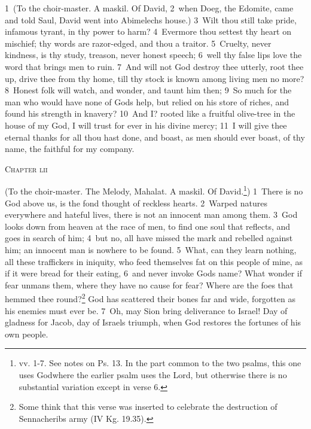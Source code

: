 \documentclass[10pt]{book} %
\begin{document}
\textcolor{benred8}{1}~(To the choir-master. A maskil. Of David, \textcolor{benred8}{2}~when Doeg, the Edomite, came and told Saul, David went into Abimelech\textquotesingle s house.)
\textcolor{benred8}{3}~Wilt thou still take pride, infamous tyrant, in thy power to harm? \textcolor{benred8}{4}~Evermore thou settest thy heart on mischief; thy words are razor-edged, and thou a traitor. \textcolor{benred8}{5}~Cruelty, never kindness, is thy study, treason, never honest speech; \textcolor{benred8}{6}~well thy false lips love the word that brings men to ruin. \textcolor{benred8}{7}~And will not God destroy thee utterly, root thee up, drive thee from thy home, till thy stock is known among living men no more? \textcolor{benred8}{8}~Honest folk will watch, and wonder, and taunt him then; \textcolor{benred8}{9}~So much for the man who would have none of God\textquotesingle s help, but relied on his store of riches, and found his strength in knavery? \textcolor{benred8}{10}~And I? rooted like a fruitful olive-tree in the house of my God, I will trust for ever in his divine mercy; \textcolor{benred8}{11}~I will give thee eternal thanks for all thou hast done, and boast, as men should ever boast, of thy name, the faithful for my company.
\begin{large}\begin{center}\textsc{Chapter lii}\end{center}\end{large}
(To the choir-master. The Melody, Mahalat. A maskil. Of David.\footnote[1]{vv. 1-7. See notes on Ps. 13. In the part common to the two psalms, this one uses \textasciigrave God\textquotesingle  where the earlier psalm uses \textasciigrave the Lord\textquotesingle , but otherwise there is no substantial variation except in verse 6.})
\textcolor{benred8}{1}~There is no God above us, is the fond thought of reckless hearts. \textcolor{benred8}{2}~Warped natures everywhere and hateful lives, there is not an innocent man among them. \textcolor{benred8}{3}~God looks down from heaven at the race of men, to find one soul that reflects, and goes in search of him; \textcolor{benred8}{4}~but no, all have missed the mark and rebelled against him; an innocent man is nowhere to be found. \textcolor{benred8}{5}~What, can they learn nothing, all these traffickers in iniquity, who feed themselves fat on this people of mine, as if it were bread for their eating, \textcolor{benred8}{6}~and never invoke God\textquotesingle s name? What wonder if fear unmans them, where they have no cause for fear? Where are the foes that hemmed thee round?\footnote[2]{Some think that this verse was inserted to celebrate the destruction of Sennacherib\textquotesingle s army (IV Kg. 19.35).} God has scattered their bones far and wide, forgotten as his enemies must ever be. \textcolor{benred8}{7}~Oh, may Sion bring deliverance to Israel! Day of gladness for Jacob, day of Israel\textquotesingle s triumph, when God restores the fortunes of his own people.
\end{document}
